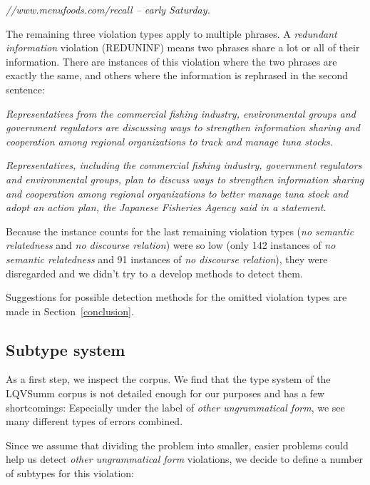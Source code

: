 \documentclass[a4paper,10pt]{scrartcl}
\theoremstyle{style}
\begin{document}
\quad\textit{//www.menufoods.com/recall -- early Saturday.}

The remaining three violation types apply to multiple phrases. A \textit{redundant information} violation (REDUNINF) means two phrases share a lot or all of their information. There are instances of this violation where the two phrases are exactly the same, and others where the information is rephrased in the second sentence:

\quad\textit{Representatives from the commercial fishing industry, environmental groups and government regulators are discussing ways to strengthen information sharing and cooperation among regional organizations to track and manage tuna stocks.}

\quad\textit{Representatives, including the commercial fishing industry, government regulators and environmental groups, plan to discuss ways to strengthen information sharing and cooperation among regional organizations to better manage tuna stock and adopt an action plan, the Japanese Fisheries Agency said in a statement.}

Because the instance counts for the last remaining violation types (\textit{no semantic relatedness} and \textit{no discourse relation}) were so low (only 142 instances of \textit{no semantic relatedness} and 91 instances of \textit{no discourse relation}), they were disregarded and we didn't try to a develop methods to detect them.

Suggestions for possible detection methods for the omitted violation types are made in Section~\ref{conclusion}.

\subsection{Subtype system}
\label{s_subtypes}

As a first step, we inspect the corpus. We find that the type system of the LQVSumm corpus \citep{friedrichlqvsumm} is not detailed enough for our purposes and has a few shortcomings: Especially under the label of \textit{other ungrammatical form}, we see many different types of errors combined.

Since we assume that dividing the problem into smaller, easier problems could help us detect \textit{other ungrammatical form} violations, we decide to define a number of subtypes for this violation:
\end{document}
